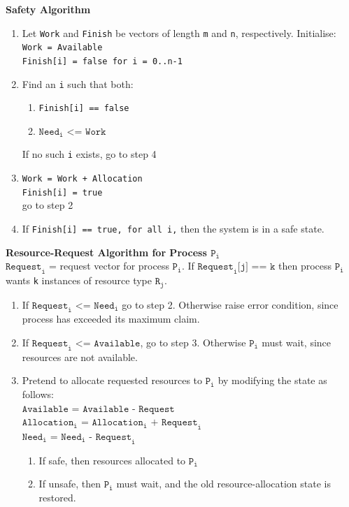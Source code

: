 \documentclass[11pt,a4paper]{article}
\begin{document}
\textbf{Safety Algorithm}
\begin{enumerate}
    \item Let \texttt{Work} and \texttt{Finish} be vectors of length \texttt{m} and \texttt{n},
        respectively.
        Initialise: \\
        \texttt{Work = Available} \\
        \texttt{Finish[i] = false for i = 0..n-1}
    \item Find an \texttt{i} such that both:
        \begin{enumerate}
            \item \texttt{Finish[i] == false}
            \item $\texttt{Need}_\texttt{i} \texttt{ <= Work}$
        \end{enumerate}
        If no such \texttt{i} exists, go to step 4
    \item \texttt{Work = Work + Allocation} \\
        \texttt{Finish[i] = true} \\
        go to step 2
    \item If \texttt{Finish[i] == true, for all i,}
        then the system is in a safe state.
\end{enumerate}

\textbf{Resource-Request Algorithm for Process $\texttt{P}_\texttt{i}$} \\
$\texttt{Request}_\texttt{i}$ = request vector for process $\texttt{P}_\texttt{i}$.
If $\texttt{Request}_\texttt{i}\texttt{[j] == k}$
then process $\texttt{P}_\texttt{i}$ wants \texttt{k} instances of resource type
$\texttt{R}_\texttt{j}$.
\begin{enumerate}
    \item If $\texttt{Request}_\texttt{i} \texttt{ <= Need}_\texttt{i}$ go to step 2.
        Otherwise raise error condition, since process has exceeded its maximum claim.
    \item If $\texttt{Request}_\texttt{i} \texttt{ <= Available}$, go to step 3.
        Otherwise $\texttt{P}_\texttt{i}$ must wait, since resources are not available.
    \item Pretend to allocate requested resources to $\texttt{P}_\texttt{i}$ by modifying
        the state as follows: \\
        $\texttt{Available = Available - Request}$ \\
        $\texttt{Allocation}_\texttt{i} \texttt{ =
        Allocation}_\texttt{i} \texttt{ + Request}_\texttt{i}$ \\
        $\texttt{Need}_\texttt{i} \texttt{ = Need}_\texttt{i} \texttt{ - Request}_\texttt{i}$
        \begin{enumerate}
            \item If safe, then resources allocated to $\texttt{P}_\texttt{i}$
            \item If unsafe, then $\texttt{P}_\texttt{i}$ must wait,
                and the old resource-allocation state is restored.
        \end{enumerate}
\end{enumerate}
\end{document}
